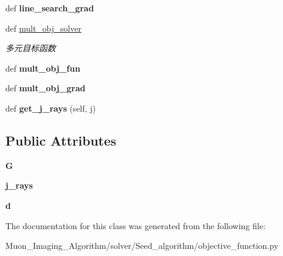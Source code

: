 \begin{DoxyCompactItemize}
def {\bfseries line\+\_\+search\+\_\+grad}
\item 
\mbox{\label{classobjective__function_1_1Obj__fun__Tools_a5d4ebe3f605c7df45f04b755ba55d1ac}} 
def \hyperlink{classobjective__function_1_1Obj__fun__Tools_a5d4ebe3f605c7df45f04b755ba55d1ac}{mult\+\_\+obj\+\_\+solver}
\begin{DoxyCompactList}\small\item\em 多元目标函数 \end{DoxyCompactList}\item 
\mbox{\label{classobjective__function_1_1Obj__fun__Tools_a40565fb5ce12b9882e7b68b91c1165ab}} 
def {\bfseries mult\+\_\+obj\+\_\+fun}
\item 
\mbox{\label{classobjective__function_1_1Obj__fun__Tools_a0d84740a2d79dd7265536962cf477dac}} 
def {\bfseries mult\+\_\+obj\+\_\+grad}
\item 
\mbox{\label{classobjective__function_1_1Obj__fun__Tools_a1993cc0c293d4ba8806da981f4ceb139}} 
def {\bfseries get\+\_\+j\+\_\+rays} (self, j)
\end{DoxyCompactItemize}
\subsection*{Public Attributes}
\begin{DoxyCompactItemize}
\item 
\mbox{\label{classobjective__function_1_1Obj__fun__Tools_af038018389b8dbee15f510180c8498ad}} 
{\bfseries G}
\item 
\mbox{\label{classobjective__function_1_1Obj__fun__Tools_ac746917420f0728fafc28479a847fedd}} 
{\bfseries j\+\_\+rays}
\item 
\mbox{\label{classobjective__function_1_1Obj__fun__Tools_ad65f37f76b3b2e7a5ea207421c9c39f3}} 
{\bfseries d}
\end{DoxyCompactItemize}


The documentation for this class was generated from the following file\+:\begin{DoxyCompactItemize}
\item 
Muon\+\_\+\+Imaging\+\_\+\+Algorithm/solver/\+Seed\+\_\+algorithm/objective\+\_\+function.\+py\end{DoxyCompactItemize}
